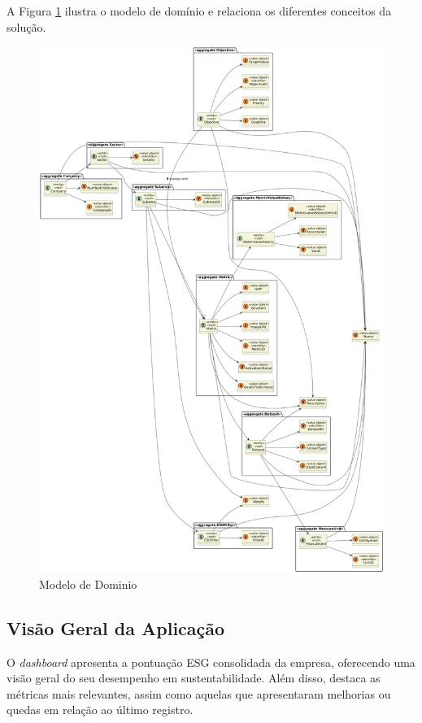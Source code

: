 A Figura \ref{fig:domain_model} ilustra o modelo de domínio e relaciona os diferentes conceitos da solução.

\begin{figure}[H]
\centering
    \includegraphics[width=\linewidth,keepaspectratio]{frontmatter/assets/diagrams/Domain Model/Domain_Model2.png}
    \caption{Modelo de Dominio}
    \label{fig:domain_model}
\end{figure}


\subsection{Visão Geral da Aplicação}
\label{subsec:VGA} 

O \textit{dashboard} apresenta a pontuação ESG consolidada da empresa, oferecendo uma visão geral do seu desempenho em sustentabilidade. Além disso, destaca as métricas mais relevantes, assim como aquelas que apresentaram melhorias ou quedas em relação ao último registro.

